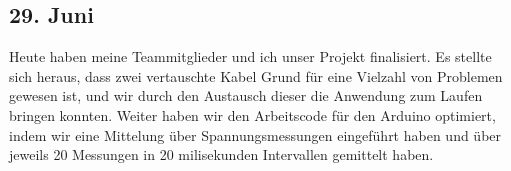 \subsection{29. Juni}
Heute haben meine Teammitglieder und ich unser Projekt finalisiert. Es stellte sich heraus, dass zwei vertauschte Kabel Grund für eine Vielzahl von Problemen gewesen ist, und wir durch den Austausch dieser die Anwendung zum Laufen bringen konnten. Weiter haben wir den Arbeitscode für den Arduino optimiert, indem wir eine Mittelung über Spannungsmessungen eingeführt haben und über jeweils 20 Messungen in 20 milisekunden Intervallen gemittelt haben.